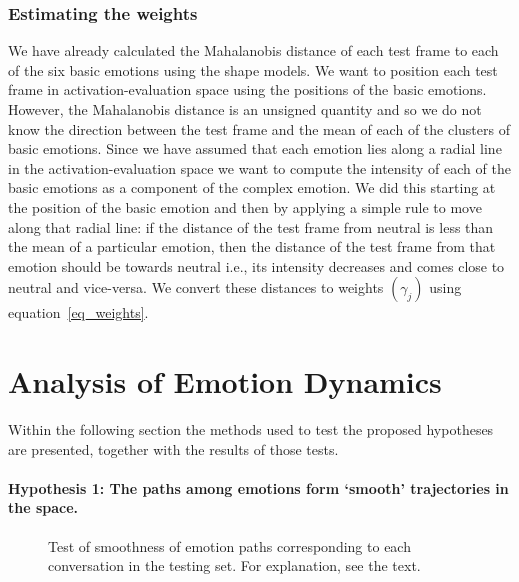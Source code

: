 \documentclass[10pt,journal,cspaper,compsoc]{IEEEtran}
\begin{document}
\subsubsection{Estimating the weights}
\label{sec_est_weight}
We have already calculated the Mahalanobis distance of each test frame to each of the six basic emotions using the shape models. We want to position each test frame in activation-evaluation space using the positions of the basic emotions. However, the Mahalanobis distance is an unsigned quantity and so we do not know the direction between the test frame and the mean of each of the clusters of basic emotions. Since we have assumed that each emotion lies along a radial line in the activation-evaluation space we want to compute the intensity of each of the basic emotions as a component of the complex emotion. We did this starting at the position of the basic emotion and then by applying a simple rule to move along that radial line: if the distance of the test frame from neutral is less than the mean of a particular emotion, then the distance of the test frame from that emotion should be towards neutral i.e., its intensity decreases and comes close to neutral and vice-versa. We convert these distances to weights $(\gamma_{j})$ using equation~\ref{eq_weights}.

\section{Analysis of Emotion Dynamics}
\label{sec_analysis}
Within the following section the methods used to test the proposed hypotheses are presented, together with the results of those tests.

\paragraph*{Hypothesis 1: The paths among emotions form `smooth' trajectories in the space.}
\label{para_hypothesis_1}

\begin{figure}[!tp]
\begin{center}
\end{center}
\caption{Test of smoothness of emotion paths corresponding to each conversation in the testing set. For explanation, see the text.}
\label{fig_hurst}
\end{figure}
\end{document}
